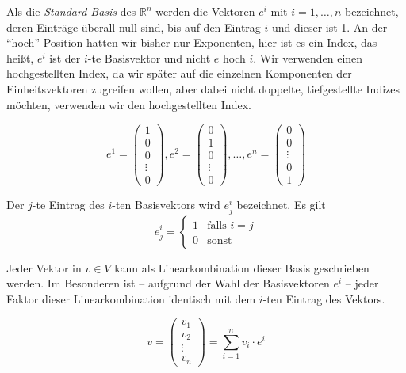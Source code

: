 \begin{definition}
Als die \emph{Standard-Basis} des $\mathbb{R}^n$ werden die Vektoren $e^i$ mit $i=1,\dots,n$ bezeichnet, deren Einträge überall null sind, bis auf den Eintrag $i$ und dieser ist 1. An der "`hoch"' Position hatten wir bisher nur Exponenten, hier ist es ein Index, das heißt, $e^i$ ist der $i$-te Basisvektor und nicht $e$ hoch $i$. Wir verwenden einen hochgestellten Index, da wir später auf die einzelnen Komponenten der Einheitsvektoren zugreifen wollen, aber dabei nicht doppelte, tiefgestellte Indizes möchten, verwenden wir den hochgestellten Index. 

\begin{equation}
e^1 = \begin{pmatrix}
1\\
0\\
0\\
\vdots \\
0
\end{pmatrix}, e^2 = \begin{pmatrix}
0\\
1\\
0\\
\vdots \\
0
\end{pmatrix}, \dots, e^n = \begin{pmatrix}
0\\
0\\
\vdots \\
0\\
1
\end{pmatrix}
\end{equation}
\end{definition}

Der $j$-te Eintrag des $i$-ten Basisvektors wird $e^i_j$ bezeichnet. Es gilt
\begin{equation*}
e^i_j = \begin{cases}
1 & \text{falls } i=j \\
0 & \text{sonst}
\end{cases}
\end{equation*}

Jeder Vektor in $v\in V$ kann als Linearkombination dieser Basis geschrieben werden. Im Besonderen ist -- aufgrund der Wahl der Basisvektoren $e^i$ -- jeder Faktor dieser Linearkombination identisch mit dem $i$-ten Eintrag des Vektors. 

\[
v = \begin{pmatrix}
v_1 \\
v_2 \\
\vdots \\
v_n
\end{pmatrix} = \sum_{i=1}^{n} v_i \cdot e^i
\]

